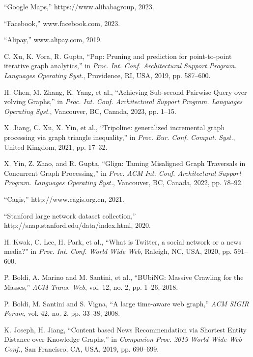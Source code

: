 \documentclass[10pt,journal,compsoc]{IEEEtran}
\begin{document}
\begin{thebibliography}{100}

``Google Maps,'' https://www.alibabagroup, 2023.

``Facebook,'' www.facebook.com, 2023.

``Alipay,'' www.alipay.com, 2019.

C. Xu, K. Vora, R. Gupta, ``Pnp: Pruning and prediction for point-to-point iterative graph analytics,'' in \textit{Proc. Int. Conf. Architectural Support Program. Languages Operating Syst.}, Providence, RI, USA, 2019, pp. 587--600.

H. Chen, M. Zhang, K. Yang, et al., ``Achieving Sub-second Pairwise Query over volving Graphs,'' in \textit{Proc. Int. Conf. Architectural Support Program. Languages Operating Syst.}, Vancouver, BC, Canada, 2023, pp. 1--15.

X. Jiang, C. Xu, X. Yin, et al., ``Tripoline: generalized incremental graph processing via graph triangle inequality,'' in \textit{Proc. Eur. Conf. Comput. Syst.}, United Kingdom, 2021, pp. 17--32.

X. Yin, Z. Zhao, and R. Gupta, ``Glign: Taming Misaligned Graph Traversals in Concurrent Graph Processing,'' in \textit{Proc. ACM Int. Conf. Architectural Support Program. Languages Operating Syst.}, Vancouver, BC, Canada, 2022, pp. 78--92.


``Cagis,'' http://www.cagis.org.cn, 2021.

``Stanford large network dataset collection,'' http://snap.stanford.edu/data/index.html, 2020.

H. Kwak, C. Lee, H. Park, et al., ``What is Twitter, a social network or a news media?'' in \textit{Proc. Int. Conf. World Wide Web}, Raleigh, NC, USA, 2020, pp. 591--600.

P. Boldi, A. Marino and M. Santini, et al.,  ``BUbiNG: Massive Crawling for the Masses,''  \textit{ACM Trans. Web}, vol. 12, no. 2, pp. 1--26, 2018.

P. Boldi, M. Santini and S. Vigna,  ``A large time-aware web graph,''  \textit{ACM SIGIR Forum}, vol. 42, no. 2, pp. 33--38, 2008.

K. Joseph, H. Jiang, ``Content based News Recommendation via Shortest Entity Distance over Knowledge Graphs,'' in \textit{Companion Proc. 2019 World Wide Web Conf.}, San Francisco, CA, USA, 2019, pp. 690--699.


\end{thebibliography}
\end{document}
